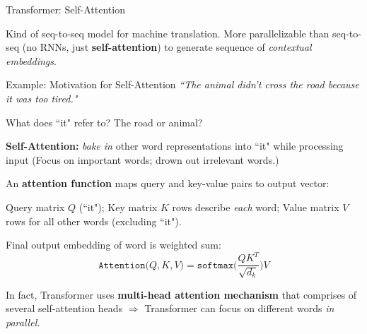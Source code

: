 \begin{frame}{Transformer: Self-Attention}
    \vspace{15pt}
    
    \begin{itemizeSpaced}{2pt}
        \item Kind of seq-to-seq model for machine translation. More parallelizable than seq-to-seq (no RNNs, just \textbf{self-attention}) to generate sequence of \textit{contextual embeddings}.
        
    \end{itemizeSpaced}
    
    \vspace{-5pt}
    
    \begin{exampleBlock}{Example: Motivation for Self-Attention}
    {\small \emph{``The animal didn't cross the road because it was too tired."}}\newline 
    
    What does ``it" refer to? The road or animal?
    \end{exampleBlock}
    
    \vspace{-10pt}
    \begin{itemizeSpaced}{6pt}
        \pinkbox \textbf{Self-Attention: } \emph{bake in} other word representations into ``it" while processing input (Focus on important words; drown out irrelevant words.)
        
        \item An \textbf{attention function} maps query and key-value pairs to output vector:
        
        \begin{itemizeSpaced}{2pt}
         
            \item Query matrix $Q$ (``it"); Key matrix $K$ rows describe \emph{each} word; Value matrix $V$ rows for all other words (excluding ``it"). 
            
            \item Final output embedding of word is weighted sum: 
            \vspace{-10pt}
            $$
            \texttt{Attention} \Big(Q, K, V \Big) = \texttt{softmax} \Bigg(\frac {QK^T} {\sqrt{d_k}} \Bigg) V
            $$
            
        \end{itemizeSpaced}
        \vspace{-10pt}
        
        \pinkbox In fact, Transformer uses \textbf{multi-head attention mechanism} that comprises of several self-attention heads $\Rightarrow$ Transformer can focus on different words \emph{in parallel.}
        
        
    \end{itemizeSpaced}
\end{frame}


